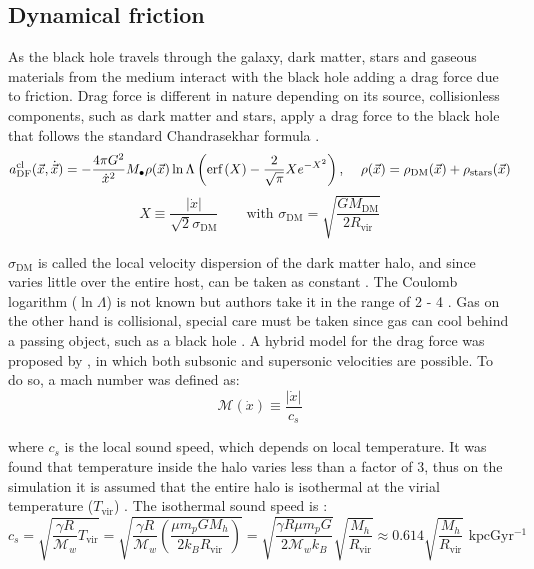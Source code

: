 		\subsection{Dynamical friction}
			As the black hole travels through the galaxy, dark matter, stars and gaseous materials from the medium interact with the black hole adding a drag force due to friction. Drag force is different in nature depending on its source, collisionless components, such as dark matter and stars, apply a drag force to the black hole that follows the standard Chandrasekhar formula \cite{binney2011galactic, madau2004effect, tanaka2009assembly, choksi2017recoiling}.
			\begin{equation}\label{eq: df_cl}
				a_\text{DF}^\text{cl}(\vec{x}, \dot{\vec{x}}) = -\dfrac{4\pi G^2}{\dot{x}^2} M_\bullet\rho(\vec{x})\ln\Lambda\left(\text{erf}\left(X\right) - \dfrac{2}{\sqrt{\pi}}Xe^{-X^2}\right)\text{, } \quad \rho(\vec{x}) = \rho_\text{DM}(\vec{x}) + \rho_\text{stars}(\vec{x})
			\end{equation}
			\begin{equation}
				X \equiv \dfrac{|\dot{x}|}{\sqrt{2}\sigma_\text{DM}} \qquad \text{with } \sigma_\text{DM} = \sqrt{\dfrac{GM_\text{DM}}{2R_\text{vir}}}
			\end{equation}
			
			$\sigma_\text{DM}$ is called the local velocity dispersion of the dark matter halo, and since varies little over the entire host, can be taken as constant \cite{tanaka2009assembly, choksi2017recoiling}. The Coulomb logarithm ($\ln\Lambda$) is not known but authors take it in the range of 2 - 4 \cite{choksi2017recoiling}. Gas on the other hand is collisional, special care must be taken since gas can cool behind a passing object, such as a black hole \cite{choksi2017recoiling}. A hybrid model for the drag force was proposed by \citeauthor{tanaka2009assembly}, in which both subsonic and supersonic velocities are possible. To do so, a mach number was defined as:
			\begin{equation}
				\mathcal{M}(\dot{x}) \equiv \dfrac{|\dot{x}|}{c_s}
			\end{equation}
			
			where $c_s$ is the local sound speed, which depends on local temperature. It was found that temperature inside the halo varies less than a factor of 3, thus on the simulation it is assumed that the entire halo is isothermal at the virial temperature ($T_\text{vir}$) \cite{choksi2017recoiling}. The isothermal sound speed is \cite{barkana2001beginning}:
			\begin{equation}\label{eq: soundSpeed}
				c_s = \sqrt{\dfrac{\gamma R}{\mathcal{M}_w}T_\text{vir}} = \sqrt{\dfrac{\gamma R}{\mathcal{M}_w}\left(\dfrac{\mu m_p G M_h}{2k_BR_\text{vir}}\right)} = \sqrt{\dfrac{\gamma R\mu m_pG}{2\mathcal{M}_wk_B}} \sqrt{\dfrac{M_h}{R_\text{vir}}} \approx 0.614 \sqrt{\dfrac{M_h}{R_\text{vir}}}\text{ kpcGyr$^{-1}$}
			\end{equation}
			
